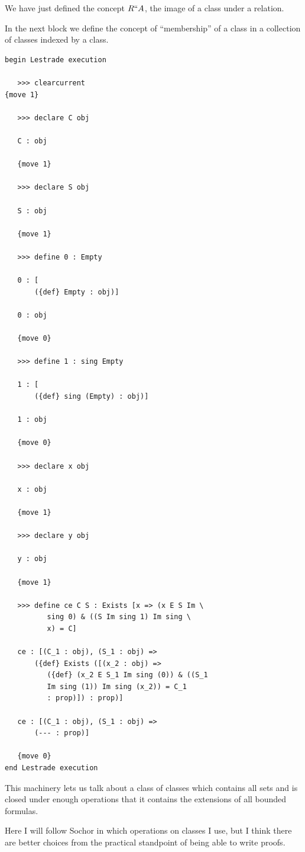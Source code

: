 \documentclass[12pt]{article}
\begin{document}
We have just defined the concept $R``A$, the image of a class under a relation.

In the next block we define the concept of ``membership'' of a class in a collection of classes indexed by a class.

\begin{verbatim}
begin Lestrade execution

   >>> clearcurrent
{move 1}

   >>> declare C obj

   C : obj

   {move 1}

   >>> declare S obj

   S : obj

   {move 1}

   >>> define 0 : Empty

   0 : [
       ({def} Empty : obj)]

   0 : obj

   {move 0}

   >>> define 1 : sing Empty

   1 : [
       ({def} sing (Empty) : obj)]

   1 : obj

   {move 0}

   >>> declare x obj

   x : obj

   {move 1}

   >>> declare y obj

   y : obj

   {move 1}

   >>> define ce C S : Exists [x => (x E S Im \
          sing 0) & ((S Im sing 1) Im sing \
          x) = C]

   ce : [(C_1 : obj), (S_1 : obj) => 
       ({def} Exists ([(x_2 : obj) => 
          ({def} (x_2 E S_1 Im sing (0)) & ((S_1 
          Im sing (1)) Im sing (x_2)) = C_1 
          : prop)]) : prop)]

   ce : [(C_1 : obj), (S_1 : obj) => 
       (--- : prop)]

   {move 0}
end Lestrade execution
\end{verbatim}

This machinery lets us talk about a class of classes which contains all sets and is closed under enough operations that it contains the extensions of all bounded formulas.

Here I will follow Sochor in which operations on classes I use, but I think there are better choices from the practical standpoint of being able to write proofs.
\end{document}
